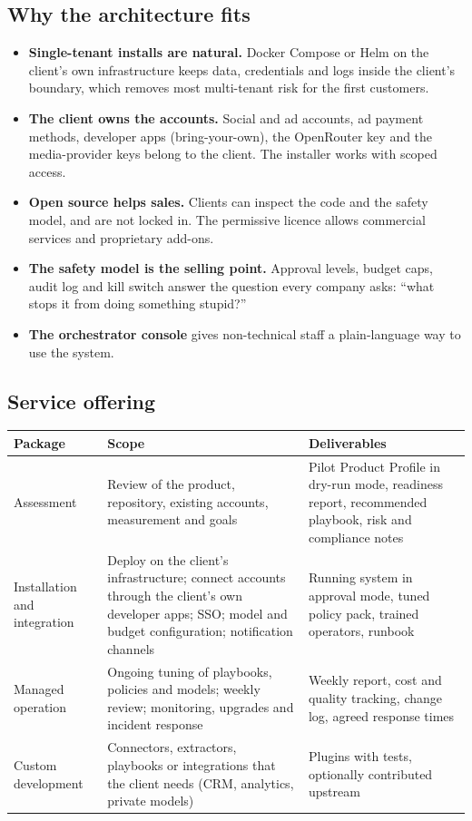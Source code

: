 \documentclass[11pt,a4paper]{article}
\begin{document}
\subsection{Why the architecture fits}
\begin{itemize}
  \item \textbf{Single-tenant installs are natural.} Docker Compose or Helm on the client's own infrastructure keeps data, credentials and logs inside the client's boundary, which removes most multi-tenant risk for the first customers.
  \item \textbf{The client owns the accounts.} Social and ad accounts, ad payment methods, developer apps (bring-your-own), the OpenRouter key and the media-provider keys belong to the client. The installer works with scoped access.
  \item \textbf{Open source helps sales.} Clients can inspect the code and the safety model, and are not locked in. The permissive licence allows commercial services and proprietary add-ons.
  \item \textbf{The safety model is the selling point.} Approval levels, budget caps, audit log and kill switch answer the question every company asks: ``what stops it from doing something stupid?''
  \item \textbf{The orchestrator console} gives non-technical staff a plain-language way to use the system.
\end{itemize}

\subsection{Service offering}
\begin{longtable}{@{}p{3.1cm}p{5.5cm}p{6.7cm}@{}}
\toprule
\textbf{Package} & \textbf{Scope} & \textbf{Deliverables}\\
\midrule
\endhead
Assessment & Review of the product, repository, existing accounts, measurement and goals & Pilot Product Profile in dry-run mode, readiness report, recommended playbook, risk and compliance notes\\
Installation and integration & Deploy on the client's infrastructure; connect accounts through the client's own developer apps; SSO; model and budget configuration; notification channels & Running system in approval mode, tuned policy pack, trained operators, runbook\\
Managed operation & Ongoing tuning of playbooks, policies and models; weekly review; monitoring, upgrades and incident response & Weekly report, cost and quality tracking, change log, agreed response times\\
Custom development & Connectors, extractors, playbooks or integrations that the client needs (CRM, analytics, private models) & Plugins with tests, optionally contributed upstream\\
\bottomrule
\end{longtable}
\end{document}
